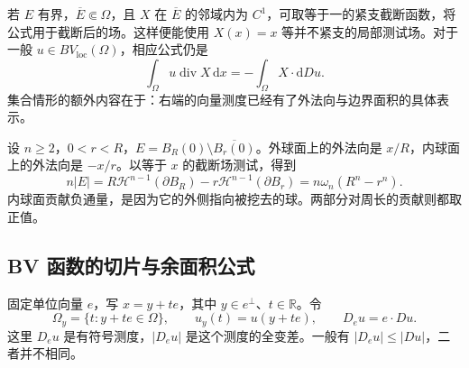 若 \(E\) 有界，\(\overline E\Subset\Omega\)，且 \(X\) 在 \(\overline E\) 的邻域内为 \(C^1\)，可取等于一的紧支截断函数，将公式用于截断后的场。这样便能使用 \(X(x)=x\) 等并不紧支的局部测试场。对于一般 \(u\in BV_{\mathrm{loc}}(\Omega)\)，相应公式仍是
\[
	\int_\Omega u\operatorname{div}X\,\mathrm dx=-\int_\Omega X\cdot\mathrm dDu.
\]
集合情形的额外内容在于：右端的向量测度已经有了外法向与边界面积的具体表示。

\begin{example}\label{g3:exm:annulus-gauss-green}
	设 \(n\ge2\)，\(0<r<R\)，\(E=B_R(0)\setminus\overline{B_r(0)}\)。外球面上的外法向是 \(x/R\)，内球面上的外法向是 \(-x/r\)。以等于 \(x\) 的截断场测试，得到
	\[
		n|E|=R\mathcal H^{n-1}(\partial B_R)-r\mathcal H^{n-1}(\partial B_r)
		=n\omega_n(R^n-r^n).
	\]
	内球面贡献负通量，是因为它的外侧指向被挖去的球。两部分对周长的贡献则都取正值。
\end{example}

\subsection{BV 函数的切片与余面积公式}
\label{g3:subsec:2105:02}
固定单位向量 \(e\)，写 \(x=y+te\)，其中 \(y\in e^\perp\)、\(t\in\mathbb R\)。令
\[
	\Omega_y=\{t:y+te\in\Omega\},\qquad
	u_y(t)=u(y+te),\qquad D_eu=e\cdot Du.
\]
这里 \(D_eu\) 是有符号测度，\(|D_eu|\) 是这个测度的全变差。一般有 \(|D_eu|\le|Du|\)，二者并不相同。

